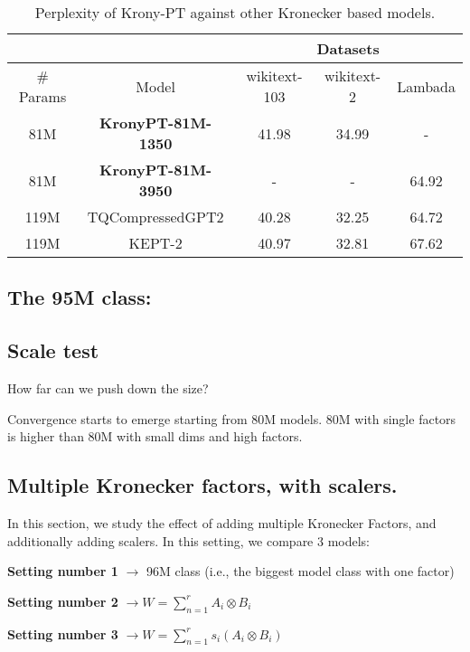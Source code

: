 \documentclass{article}
\begin{document}
{\begin{table}[h]
\centering
\begin{tabular}{|c|c|c|c|c|}
\hline
 & & \multicolumn{3}{c|}{Datasets} \\ \hline
\# Params &  Model            & wikitext-103 & wikitext-2 & Lambada \\ \hline
81M       & \textbf{KronyPT-81M-1350}  & 41.98        & 34.99      & -          \\ \hline
81M       & \textbf{KronyPT-81M-3950}  & -            & -          & 64.92      \\ \hline
119M       & TQCompressedGPT2  & 40.28        & 32.25      & 64.72      \\ \hline
119M       & KEPT-2   & 40.97        & 32.81      & 67.62      \\ \hline
\end{tabular}
\caption{Perplexity of Krony-PT against other Kronecker based models.}
\end{table}

\subsection{The 95M class:}%
\label{sub:The 95M class:}

\subsection{Scale test}%
\label{sub:Scale test}
How far can we push down the size? 

Convergence starts to emerge starting from 80M models.   80M with single factors is higher than 80M with small dims and high factors.

\subsection{Multiple Kronecker factors, with scalers.}%
\label{sub:Multiple Kronecker factors, with scalers.}

In this section, we study the effect of adding multiple Kronecker Factors, and additionally adding scalers. In this setting, we compare 3 models:

\textbf{Setting number 1} $\rightarrow$ 96M class (i.e., the biggest model class with one factor)

\textbf{Setting number 2} $\rightarrow W = \sum_{n=1}^{r} A_i \otimes B_i $ 

\textbf{Setting number 3} $\rightarrow W  = \sum_{n=1}^{r} s_i (A_i \otimes B_i)$

}
\end{document}
